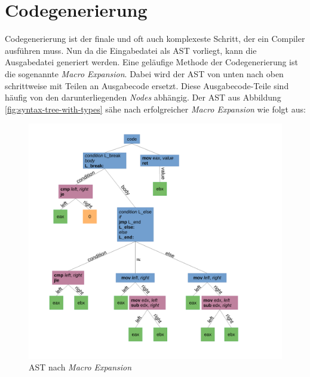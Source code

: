 \section{Codegenerierung} \label{sec:traditional_code_generation}
Codegenerierung ist der finale und oft auch komplexeste Schritt, der ein Compiler ausführen muss.
Nun da die Eingabedatei als AST vorliegt, kann die Ausgabedatei generiert werden. Eine geläufige Methode der Codegenerierung ist die sogenannte \textit{Macro Expansion}.
Dabei wird der AST von unten nach oben schrittweise mit Teilen an Ausgabecode ersetzt.
Diese Ausgabecode-Teile sind häufig von den darunterliegenden \textit{Nodes} abhängig. Der AST aus Abbildung \ref{fig:syntax-tree-with-types} sähe nach erfolgreicher \textit{Macro Expansion} wie folgt aus:

\begin{figure}[H]
    \centering
    \includegraphics[scale=0.4]{resources/images/AST_macro_expansion.pdf}
    \caption[AST nach \textit{Macro Expansion}. (Basierend auf Abbildung \ref{fig:syntax-tree})]{AST nach \textit{Macro Expansion}}
    \label{fig:syntax-tree-after-macro-expansion}
\end{figure}

